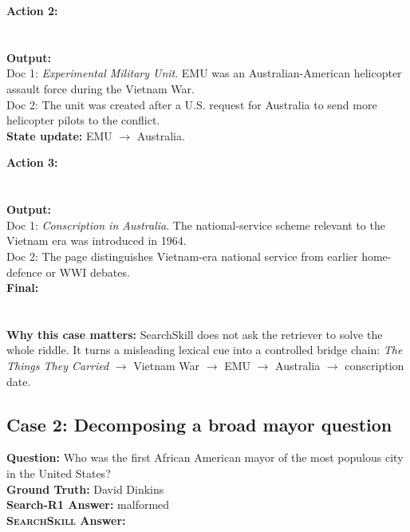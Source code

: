 \documentclass{article}
\newcommand{\Ours}{\textsc{SearchSkill}\xspace}
\begin{document}
\textbf{Action 2:}\\
\\
\\
\textbf{Output:}\\
Doc 1: \emph{Experimental Military Unit}. EMU was an Australian-American helicopter assault force during the Vietnam War.\\
Doc 2: The unit was created after a U.S. request for Australia to send more helicopter pilots to the conflict.\\
\textbf{State update:} EMU \(\rightarrow\) Australia.

\textbf{Action 3:}\\
\\
\\
\textbf{Output:}\\
Doc 1: \emph{Conscription in Australia}. The national-service scheme relevant to the Vietnam era was introduced in 1964.\\
Doc 2: The page distinguishes Vietnam-era national service from earlier home-defence or WWI debates.\\
\textbf{Final:}\\
\\
\\
\textbf{Why this case matters:} SearchSkill does not ask the retriever to solve the whole riddle. It turns a misleading lexical cue into a controlled bridge chain: \emph{The Things They Carried} \(\rightarrow\) Vietnam War \(\rightarrow\) EMU \(\rightarrow\) Australia \(\rightarrow\) conscription date.
\casehr

\subsection{Case 2: Decomposing a broad mayor question}
\casehr
\small
\noindent\textbf{Question:} Who was the first African American mayor of the most populous city in the United States?\\
\textbf{Ground Truth:} David Dinkins\\
\textbf{Search-R1 Answer:} malformed \\
\textbf{\Ours Answer:} 
\end{document}
